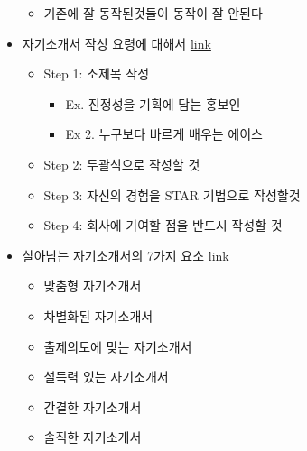 \documentclass[12pt]{article}
\begin{document}
\begin{itemize}
\begin{itemize}
        \item 기존에 잘 동작된것들이 동작이 잘 안된다

    \end{itemize}
    \item 자기소개서 작성 요령에 대해서 \href{https://brunch.co.kr/@hklim/11}{link}
    \begin{itemize}
        \item Step 1: 소제목 작성
        \begin{itemize}
            \item Ex. 진정성을 기휙에 담는 홍보인
            \item Ex 2. 누구보다 바르게 배우는 에이스
        \end{itemize}
        \item Step 2: 두괄식으로 작성할 것
        \item Step 3: 자신의 경험을 STAR 기법으로 작성할것
        \item Step 4: 회사에 기여할 점을 반드시 작성할 것
    \end{itemize}

    \bigskip
    \item 살아남는 자기소개서의 7가지 요소 \href{https://brunch.co.kr/@kuehyunpark/6}{link}
    \begin{itemize}
        \item 맞춤형 자기소개서
        \item 차별화된 자기소개서
        \item 출제의도에 맞는 자기소개서
        \item 설득력 있는 자기소개서
        \item 간결한 자기소개서
        \item 솔직한 자기소개서
    \end{itemize}

\end{itemize}
\end{document}
